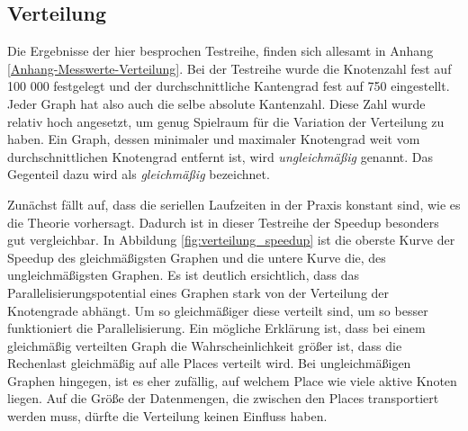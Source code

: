 \subsection{Verteilung} %
\label{sub:verteilung}
Die Ergebnisse der hier besprochen Testreihe, finden sich allesamt in Anhang \ref{Anhang-Messwerte-Verteilung}. Bei der Testreihe wurde die Knotenzahl fest auf 100 000 festgelegt und der durchschnittliche Kantengrad fest auf 750 eingestellt. Jeder Graph hat also auch die selbe absolute Kantenzahl. Diese Zahl wurde relativ hoch angesetzt, um genug Spielraum für die Variation der Verteilung zu haben. Ein Graph, dessen minimaler und maximaler Knotengrad weit vom durchschnittlichen Knotengrad entfernt ist, wird \textit{ungleichmäßig} genannt. Das Gegenteil dazu wird als \textit{gleichmäßig} bezeichnet. 

Zunächst fällt auf, dass die seriellen Laufzeiten in der Praxis konstant sind, wie es die Theorie vorhersagt. Dadurch ist in dieser Testreihe der Speedup besonders gut vergleichbar. In Abbildung \ref{fig:verteilung_speedup} ist die oberste Kurve der Speedup des gleichmäßigsten Graphen und die untere Kurve die, des ungleichmäßigsten Graphen. Es ist deutlich ersichtlich, dass das Parallelisierungspotential eines Graphen stark von der Verteilung der Knotengrade abhängt. Um so gleichmäßiger diese verteilt sind, um so besser funktioniert die Parallelisierung. Ein mögliche Erklärung ist, dass bei einem gleichmäßig verteilten Graph die Wahrscheinlichkeit größer ist, dass die Rechenlast gleichmäßig auf alle Places verteilt wird. Bei ungleichmäßigen Graphen hingegen, ist es eher zufällig, auf welchem Place wie viele aktive Knoten liegen. Auf die Größe der Datenmengen, die zwischen den Places transportiert werden muss, dürfte die Verteilung keinen Einfluss haben.

